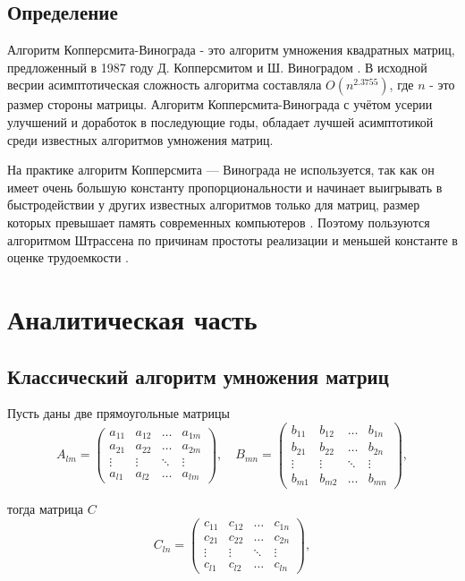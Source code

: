 \documentclass[12pt]{report}
\begin{document}
\section*{Определение}
Алгоритм Копперсмита-Винограда - это алгоритм умножения квадратных матриц, предложенный в 1987 году Д. Копперсмитом и Ш. Виноградом \cite{CoppersmithAndWinograd}. В исходной весрии асимптотическая сложность алгоритма составляла $O(n^{2.3755})$, где $n$ - это размер стороны матрицы. Алгоритм Копперсмита-Винограда с учётом усерии улучшений и доработок в последующие годы, обладает лучшей асимптотикой среди известных алгоритмов умножения матриц.

На практике алгоритм Копперсмита — Винограда не используется, так как он имеет очень большую константу пропорциональности и начинает выигрывать в быстродействии у других известных алгоритмов только для матриц, размер которых превышает память современных компьютеров \cite{RobinsonSara}.
Поэтому пользуются алгоритмом Штрассена по причинам простоты реализации и меньшей константе в оценке трудоемкости \cite{Strassen}.

\chapter{Аналитическая часть}

\section{Классический алгоритм умножения матриц}

Пусть даны две прямоугольные матрицы
\begin{equation}
	A_{lm} = \begin{pmatrix}
		a_{11} & a_{12} & \ldots & a_{1m}\\
		a_{21} & a_{22} & \ldots & a_{2m}\\
		\vdots & \vdots & \ddots & \vdots\\
		a_{l1} & a_{l2} & \ldots & a_{lm}
	\end{pmatrix},
	\quad
	B_{mn} = \begin{pmatrix}
		b_{11} & b_{12} & \ldots & b_{1n}\\
		b_{21} & b_{22} & \ldots & b_{2n}\\
		\vdots & \vdots & \ddots & \vdots\\
		b_{m1} & b_{m2} & \ldots & b_{mn}
	\end{pmatrix},
\end{equation}

тогда матрица $C$
\begin{equation}
	C_{ln} = \begin{pmatrix}
		c_{11} & c_{12} & \ldots & c_{1n}\\
		c_{21} & c_{22} & \ldots & c_{2n}\\
		\vdots & \vdots & \ddots & \vdots\\
		c_{l1} & c_{l2} & \ldots & c_{ln}
	\end{pmatrix},
\end{equation}
\end{document}

